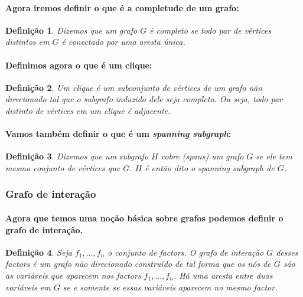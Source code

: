 \documentclass[a4paper,10pt]{article}
\theoremstyle{plain}
\newtheorem*{spn-def}{Definição}
\begin{document}
\paragraph{
  Agora iremos definir o que é a completude de um grafo:
}

\begin{spn-def} Dizemos que um grafo $G$ é completo se todo par de vértices distintos em $G$ é
  conectado por uma aresta única.
\end{spn-def}

\paragraph{
  Definimos agora o que é um clique:
}

\begin{spn-def} Um clique é um subconjunto de vértices de um grafo não direcionado tal que o
  subgrafo induzido dele seja completo. Ou seja, todo par distinto de vértices em um clique é
  adjacente.
\end{spn-def}

\paragraph{
  Vamos também definir o que é um \textit{spanning subgraph}:
}

\begin{spn-def} Dizemos que um subgrafo $H$ cobre (\textit{spans}) um grafo $G$ se ele tem mesmo
  conjunto de vértices que $G$. $H$ é então dito o \textit{spanning subgraph} de $G$.
\end{spn-def}

\subsubsection{Grafo de interação}

\paragraph{
  Agora que temos uma noção básica sobre grafos podemos definir o grafo de interação.
}

\begin{spn-def} Seja $f_1,...,f_n$ o conjunto de factors. O \textit{grafo de interação} $G$ desses
  factors é um grafo não direcionado construído de tal forma que os nós de $G$ são as variáveis que
  aparecem nos factors $f_1,...,f_n$. Há uma aresta entre duas variáveis em $G$ se e somente se
  essas variáveis aparecem no mesmo factor.
\end{spn-def}
\end{document}
